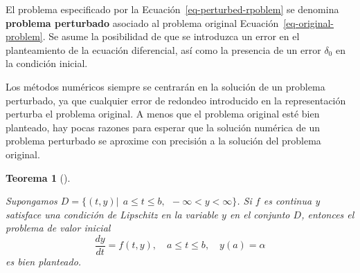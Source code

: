 \documentclass[
  spanish,
  us-letterpaper,
]{scrreprt}
\theoremstyle{definition}
\theoremstyle{plain}
\newtheorem{theorem}{Teorema}[chapter]
\theoremstyle{remark}
\begin{document}
El problema especificado por la Ecuación~\ref{eq-perturbed-rpoblem} se
denomina \textbf{problema perturbado} asociado al problema original
Ecuación~\ref{eq-original-problem}. Se asume la posibilidad de que se
introduzca un error en el planteamiento de la ecuación diferencial, así
como la presencia de un error \(δ_0\) en la condición inicial.

Los métodos numéricos siempre se centrarán en la solución de un problema
perturbado, ya que cualquier error de redondeo introducido en la
representación perturba el problema original. A menos que el problema
original esté bien planteado, hay pocas razones para esperar que la
solución numérica de un problema perturbado se aproxime con precisión a
la solución del problema original.

\begin{theorem}[]\protect\hypertarget{thm-well-posed}{}\label{thm-well-posed}

Supongamos
\(D = \{(t, y) | \ \ a \leq t \leq b, \ \  -\infty < y < \infty \}\). Si
\(f\) es continua y satisface una condición de Lipschitz en la variable
\(y\) en el conjunto \(D\), entonces el problema de valor inicial \[
\dfrac{dy}{dt} = f(t,y), \quad a\leq t \leq b, \quad y(a) = \alpha
\] es bien planteado.

\end{theorem}
\end{document}
